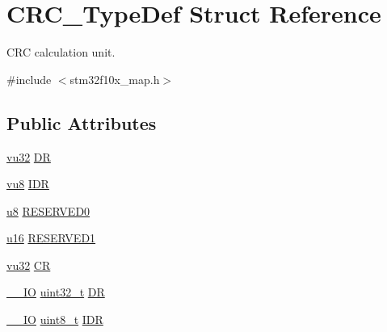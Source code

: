 \hypertarget{struct_c_r_c___type_def}{}\section{C\+R\+C\+\_\+\+Type\+Def Struct Reference}
\label{struct_c_r_c___type_def}


C\+RC calculation unit.  




{\ttfamily \#include $<$stm32f10x\+\_\+map.\+h$>$}

\subsection*{Public Attributes}
\begin{DoxyCompactItemize}
\item 
\hyperlink{agilefox_2library_2inc_2stm32f10x__type_8h_a6e2761f0a1011f84ed96b946f2c8a563}{vu32} \hyperlink{struct_c_r_c___type_def_abdd093b4ff1167510b937f99c0f7430c}{DR}
\item 
\hyperlink{agilefox_2library_2inc_2stm32f10x__type_8h_aecf7c4189e2bd5ee7ac61f5639b1327a}{vu8} \hyperlink{struct_c_r_c___type_def_aa16b8e86f6f245979a778a7797da8d97}{I\+DR}
\item 
\hyperlink{agilefox_2library_2inc_2stm32f10x__type_8h_aed742c436da53c1080638ce6ef7d13de}{u8} \hyperlink{struct_c_r_c___type_def_aa394f4dd4bd8b36d349fc5cc827aa402}{R\+E\+S\+E\+R\+V\+E\+D0}
\item 
\hyperlink{agilefox_2library_2inc_2stm32f10x__type_8h_a9e6c91d77e24643b888dbd1a1a590054}{u16} \hyperlink{struct_c_r_c___type_def_a844230c8a18a5b5a1aec6790449ec92f}{R\+E\+S\+E\+R\+V\+E\+D1}
\item 
\hyperlink{agilefox_2library_2inc_2stm32f10x__type_8h_a6e2761f0a1011f84ed96b946f2c8a563}{vu32} \hyperlink{struct_c_r_c___type_def_adce7e083b6b0fd717229f0cbaf7fbbb8}{CR}
\item 
\hyperlink{group___c_m_s_i_s___c_m3__core__definitions_gaec43007d9998a0a0e01faede4133d6be}{\+\_\+\+\_\+\+IO} \hyperlink{_p_e___types_8h_a33594304e786b158f3fb30289278f5af}{uint32\+\_\+t} \hyperlink{struct_c_r_c___type_def_a50cb22870dbb9001241cec694994e5ef}{DR}
\item 
\hyperlink{group___c_m_s_i_s___c_m3__core__definitions_gaec43007d9998a0a0e01faede4133d6be}{\+\_\+\+\_\+\+IO} \hyperlink{_p_e___types_8h_aba7bc1797add20fe3efdf37ced1182c5}{uint8\+\_\+t} \hyperlink{struct_c_r_c___type_def_ad84e8694cd4b5375ee533c2d875c3b5a}{I\+DR}
\item 

\end{DoxyCompactItemize}
